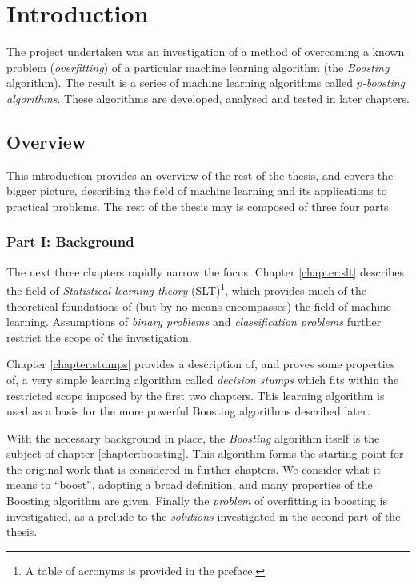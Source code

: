 
\chapter{Introduction}

The project undertaken was an investigation of a method of
overcoming a known problem (\emph{overfitting}) of a particular
machine learning algorithm (the \emph{Boosting} algorithm).  The
result is a series of machine learning algorithms called
\emph{$p$-boosting algorithms}.  These algorithms are developed,
analysed and tested in later chapters.


\section{Overview}

This introduction provides an overview of the rest of the thesis, and
covers the bigger picture, describing the field of machine learning
and its applications to practical problems.  The rest of the thesis
may is composed of three four parts.

\subsection*{Part I: Background}

The next three chapters rapidly narrow the focus.  Chapter
\ref{chapter:slt} describes the field of \emph{Statistical learning
theory} (SLT)\footnote{A table of acronyms is provided in the
preface.}, which provides much of the theoretical
foundations of (but by no means encompasses) the field of machine
learning.  Assumptions of \emph{binary problems} and
\emph{classification problems} further restrict the scope of the
investigation.

Chapter \ref{chapter:stumps} provides a description of, and proves
some properties of, a very simple learning algorithm called
\emph{decision stumps} which fits within the restricted scope imposed
by the first two chapters.  This learning algorithm
is used as a basis for the more powerful Boosting algorithms described
later.

With the necessary background in place, the \emph{Boosting} algorithm
itself is the subject of chapter \ref{chapter:boosting}.  This
algorithm forms the starting point for the original work that is
considered in further chapters.  We consider what it means to
``boost'', adopting a broad definition, and many properties of the
Boosting algorithm are given.  Finally the \emph{problem} of overfitting in
boosting is investigatied, as a prelude to the \emph{solutions}
investigated in the second part of the thesis.


